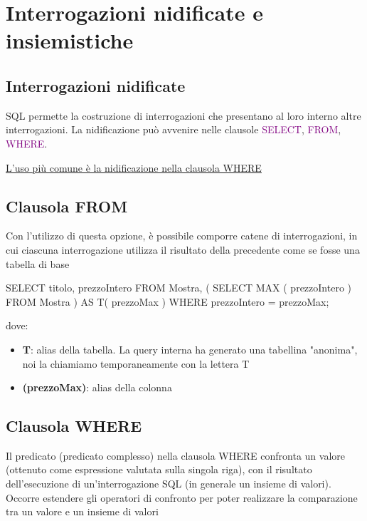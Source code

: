   \section{Interrogazioni nidificate e insiemistiche}

  \subsection*{Interrogazioni nidificate}
  SQL permette la costruzione di interrogazioni che presentano al loro interno altre interrogazioni. 
La nidificazione può avvenire nelle clausole \textcolor{purple}{SELECT}, \textcolor{purple}{FROM}, \textcolor{purple}{WHERE}.

\underline{L'uso più comune è la nidificazione nella clausola WHERE}

\subsection{Clausola FROM}
Con l'utilizzo di questa opzione, è possibile comporre catene di interrogazioni, 
in cui ciascuna interrogazione utilizza il risultato della precedente come se 
fosse una tabella di base

\begin{codiceSQL}
  SELECT titolo, prezzoIntero
FROM Mostra, ( 
  SELECT MAX ( prezzoIntero ) 
  FROM Mostra 
) AS T( prezzoMax )
WHERE prezzoIntero = prezzoMax;
\end{codiceSQL}
dove:
\begin{itemize}
  \item \textbf{T}: alias della tabella. La query interna ha generato una tabellina "anonima", noi la chiamiamo temporaneamente con la lettera T
  \item \textbf{(prezzoMax)}: alias della colonna
\end{itemize}


\subsection{Clausola WHERE}
Il predicato (predicato complesso) nella clausola WHERE confronta un valore (ottenuto come espressione valutata sulla singola riga), con il risultato dell'esecuzione di un'interrogazione SQL (in generale un insieme di valori). 
Occorre estendere gli operatori di confronto per poter realizzare la comparazione tra un valore e un insieme di valori



